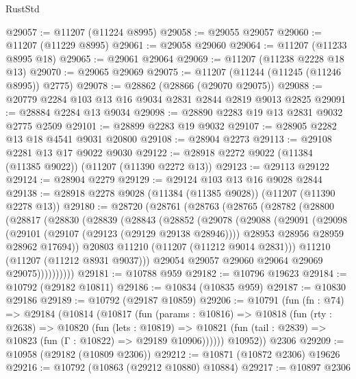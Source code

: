 \begin{lexlean}{RustStd}
\begin{coremodule}
@29057 := @11207 (@11224 @8995)
@29058 := @29055 @29057
@29060 := @11207 (@11229 @8995)
@29061 := @29058 @29060
@29064 := @11207 (@11233 @8995 @18)
@29065 := @29061 @29064
@29069 := @11207 (@11238 @2228 @18 @13)
@29070 := @29065 @29069
@29075 := @11207 (@11244 (@11245 (@11246 @8995)) @2775)
@29078 := @28862 (@28866 (@29070 @29075))
@29088 := @20779 @2284 @103 @13 @16 @9034 @2831 @2844 @2819 @9013 @2825
@29091 := @28884 @2284 @13 @9034
@29098 := @28890 @2283 @19 @13 @2831 @9032 @2775 @2509
@29101 := @28899 @2283 @19 @9032
@29107 := @28905 @2282 @13 @18 @4541 @9031 @20800
@29108 := @28904 @2273
@29113 := @29108 @2281 @13 @17 @9022 @9030
@29122 := @28918 @2272 @9022 (@11384 (@11385 @9022)) (@11207 (@11390 @2272 @13))
@29123 := @29113 @29122
@29124 := @28904 @2279
@29129 := @29124 @103 @13 @16 @9028 @2844
@29138 := @28918 @2278 @9028 (@11384 (@11385 @9028)) (@11207 (@11390 @2278 @13))
@29180 := @28720
    (@28761
      (@28763
        (@28765
          (@28782
            (@28800
              (@28817
                (@28830
                  (@28839
                    (@28843
                      (@28852
                        (@29078
                          (@29088
                            (@29091
                              (@29098
                                (@29101 (@29107 (@29123 (@29129 @29138 @28946))))
                                @28953
                                @28956
                                @28959
                                @28962
                                @17694))
                            @20803
                            @11210
                            (@11207 (@11212 @9014 @2831)))
                          @11210
                          (@11207 (@11212 @8931 @9037)))
                        @29054
                        @29057
                        @29060
                        @29064
                        @29069
                        @29075))))))))))
@29181 := @10788 @959
@29182 := @10796 @19623
@29184 := @10792 (@29182 @10811)
@29186 := @10834 (@10835 @959)
@29187 := @10830 @29186
@29189 := @10792 (@29187 @10859)
@29206 := @10791
    (fun (fn : @74) =>
    @29184
      (@10814
        (@10817
          (fun (params : @10816) =>
          @10818
            (fun (rty : @2638) =>
            @10820
              (fun (lets : @10819) =>
              @10821 (fun (tail : @2839) => @10823 (fun (Γ : @10822) => @29189 @10906))))))
        @10952))
    @2306
@29209 := @10958 (@29182 (@10809 @2306))
@29212 := @10871 (@10872 @2306) @19626
@29216 := @10792 (@10863 (@29212 @10880) @10884)
@29217 := @10897 @2306

\end{coremodule}
\end{lexlean}
